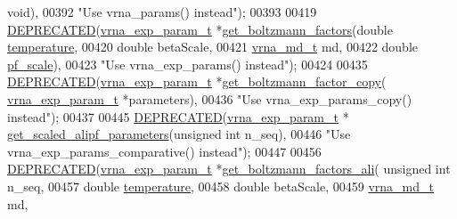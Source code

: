 \begin{DoxyCode}
{      void}),
00392 \textcolor{stringliteral}{"Use vrna\_params() instead"});
00393 
00419 \mbox{\hyperlink{params_8h_aab347a3c03fbe8e7319551b9fa0cce4a}{DEPRECATED}}(\mbox{\hyperlink{group__energy__parameters_structvrna__exp__param__s}{vrna\_exp\_param\_t}} *\mbox{\hyperlink{group__energy__parameters_gaef2b931c7e9d4ffb0a5c33df50ec2068}{get\_boltzmann\_factors}}(\textcolor{keywordtype}{double}   
        \mbox{\hyperlink{group__model__details_gab4b11c8d9c758430960896bc3fe82ead}{temperature}},
00420                                                    \textcolor{keywordtype}{double}     betaScale,
00421                                                    \mbox{\hyperlink{group__model__details_structvrna__md__s}{vrna\_md\_t}}  md,
00422                                                    \textcolor{keywordtype}{double}     \mbox{\hyperlink{group__model__details_gad3b22044065acc6dee0af68931b52cfd}{pf\_scale}}),
00423 \textcolor{stringliteral}{"Use vrna\_exp\_params() instead"});
00424 
00435 \mbox{\hyperlink{params_8h_aab347a3c03fbe8e7319551b9fa0cce4a}{DEPRECATED}}(\mbox{\hyperlink{group__energy__parameters_structvrna__exp__param__s}{vrna\_exp\_param\_t}} *\mbox{\hyperlink{group__energy__parameters_ga665a446ba8ff211e551297a8fa36ec27}{get\_boltzmann\_factor\_copy}}(
      \mbox{\hyperlink{group__energy__parameters_structvrna__exp__param__s}{vrna\_exp\_param\_t}} *parameters),
00436 \textcolor{stringliteral}{"Use vrna\_exp\_params\_copy() instead"});
00437 
00445 \mbox{\hyperlink{params_8h_aab347a3c03fbe8e7319551b9fa0cce4a}{DEPRECATED}}(\mbox{\hyperlink{group__energy__parameters_structvrna__exp__param__s}{vrna\_exp\_param\_t}} *
      \mbox{\hyperlink{group__energy__parameters_ga0ccf4e1be085a573533fd6b9da2d8cf9}{get\_scaled\_alipf\_parameters}}(\textcolor{keywordtype}{unsigned} \textcolor{keywordtype}{int} n\_seq),
00446 \textcolor{stringliteral}{"Use vrna\_exp\_params\_comparative() instead"});
00447 
00456 \mbox{\hyperlink{params_8h_aab347a3c03fbe8e7319551b9fa0cce4a}{DEPRECATED}}(\mbox{\hyperlink{group__energy__parameters_structvrna__exp__param__s}{vrna\_exp\_param\_t}} *\mbox{\hyperlink{group__energy__parameters_ga2aa1d87c97f35d2e4121634a17556829}{get\_boltzmann\_factors\_ali}}(\textcolor{keywordtype}{
      unsigned} \textcolor{keywordtype}{int} n\_seq,
00457                                                        \textcolor{keywordtype}{double}       \mbox{\hyperlink{group__model__details_gab4b11c8d9c758430960896bc3fe82ead}{temperature}},
00458                                                        \textcolor{keywordtype}{double}       betaScale,
00459                                                        \mbox{\hyperlink{group__model__details_structvrna__md__s}{vrna\_md\_t}}    md,

\end{DoxyCode}
